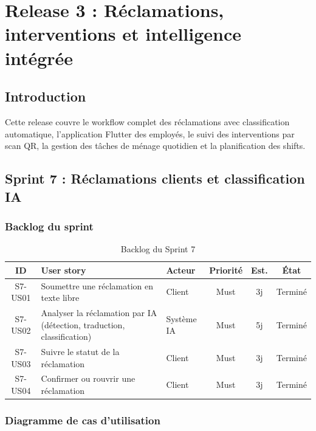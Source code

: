 \chapter{Release 3 : Réclamations, interventions et intelligence intégrée}
\label{chap:release3}
\section*{Introduction}
Cette release couvre le workflow complet des réclamations avec classification automatique, l'application Flutter des employés, le suivi des interventions par scan QR, la gestion des tâches de ménage quotidien et la planification des shifts.

\section{Sprint 7 : Réclamations clients et classification IA}
\label{sec:sprint7}

\subsection{Backlog du sprint}
\begin{table}[H]
\centering
\caption{Backlog du Sprint 7}
\small
\begin{tabularx}{\textwidth}{|c|X|p{2.2cm}|c|c|c|}
\hline
\textbf{ID} & \textbf{User story} & \textbf{Acteur} & \textbf{Priorité} & \textbf{Est.} & \textbf{État} \\ \hline
S7-US01 & Soumettre une réclamation en texte libre & Client & Must & 3j & Terminé \\ \hline
S7-US02 & Analyser la réclamation par IA (détection, traduction, classification) & Système IA & Must & 5j & Terminé \\ \hline
S7-US03 & Suivre le statut de la réclamation & Client & Must & 3j & Terminé \\ \hline
S7-US04 & Confirmer ou rouvrir une réclamation & Client & Must & 3j & Terminé \\ \hline
\end{tabularx}
\end{table}

\subsection{Diagramme de cas d'utilisation}

